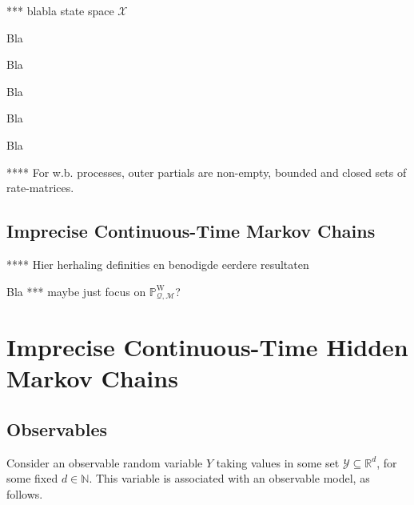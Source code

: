 \documentclass[twoside,11pt]{article}
\newcommand{\nats}{\mathbb{N}}
\newcommand{\reals}{\mathbb{R}}
\newcommand{\states}{\mathcal{X}}
\newcommand{\observs}{\mathcal{Y}}
\newcommand{\processes}{\mathbb{P}}
\newcommand{\wprocesses}{\processes^{\mathrm{W}}}
\newcommand{\rateset}{\mathcal{Q}}
\begin{document}
*** blabla state space $\states$

\begin{definition}
Bla
\end{definition}

\begin{definition}
Bla
\end{definition}

\begin{definition}
Bla
\end{definition}

\begin{definition}
Bla
\end{definition}

\begin{definition}
Bla
\end{definition}

\begin{proposition}
**** For w.b. processes, outer partials are non-empty, bounded and closed sets of rate-matrices.
\end{proposition}

\subsection{Imprecise Continuous-Time Markov Chains}

**** Hier herhaling definities en benodigde eerdere resultaten

\begin{definition}[ICTMC]
Bla *** maybe just focus on $\wprocesses_{\rateset,\mathcal{M}}$?
\end{definition}


\section{Imprecise Continuous-Time Hidden Markov Chains}

\subsection{Observables}

Consider an observable random variable $Y$ taking values in some set $\observs\subseteq\reals^d$, for some fixed $d\in\nats$. This variable is associated with an observable model, as follows.
\end{document}

